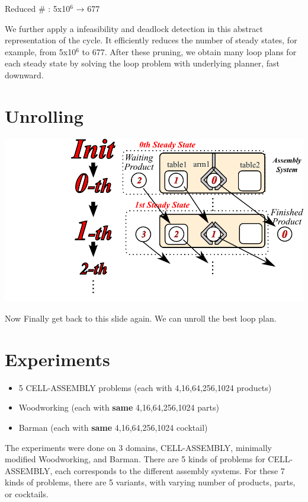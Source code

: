 Reduced \# : 5x10\(^{\text{6}}\) → 677

\begin{resume}
We further apply a infeasibility and deadlock detection in this abstract
representation of the cycle. It efficiently reduces the number of steady states,
for example, from 5x10\(^{\text{6}}\) to 677.
After these pruning, we obtain many loop plans for each steady state
by solving the loop problem with underlying planner, fast downward.
\end{resume}

\section{Unrolling}
\label{sec-8}
\includegraphics[width=\textwidth]{img/unroll.png}

\begin{resume}
Now Finally get back to this slide again.
We can unroll the best loop plan.
\end{resume}

\section{Experiments}
\label{sec-9}

\begin{itemize}
\item 5 CELL-ASSEMBLY problems (each with 4,16,64,256,1024 products)
\item Woodworking (each with \textbf{same} 4,16,64,256,1024 parts)
\item Barman (each with \textbf{same} 4,16,64,256,1024 cocktail)
\end{itemize}

\begin{resume}
The experiments were done on 3 domains, CELL-ASSEMBLY, 
minimally modified Woodworking, and Barman.
There are 5 kinds of problems for CELL-ASSEMBLY,
each corresponds to the different assembly systems.
For these 7 kinds of problems,
there are 5 variants, with varying number of products, parts, or cocktails.
\end{resume}


